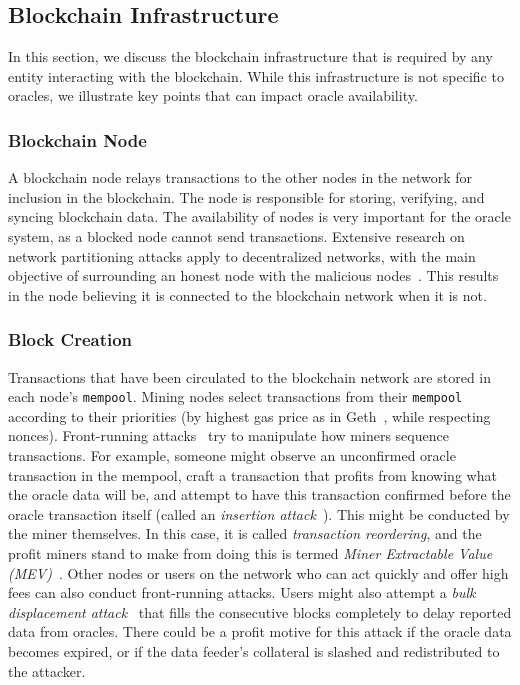 \subsection{Blockchain Infrastructure}  \label{blockchainInfrastructure}

In this section, we discuss the blockchain infrastructure that is required by any entity interacting with the blockchain. While this infrastructure is not specific to oracles, we illustrate key points that can impact oracle availability. 

\subsubsection{Blockchain Node} %

A blockchain node relays transactions to the other nodes in the network for inclusion in the blockchain. The node is responsible for storing, verifying, and syncing blockchain data. The availability of nodes is very important for the oracle system, as a blocked node cannot send transactions. Extensive research on network partitioning attacks apply to decentralized networks, with the main objective of surrounding an honest node with the malicious nodes~\cite{vasek2014empirical,neudecker2015simulation,zhang2019double,heilman2015eclipse,henningsen2019eclipsing}. This results in the node believing it is connected to the blockchain network when it is not.
 

\subsubsection{Block Creation}\label{block_creation}
Transactions that have been circulated to the blockchain network are stored in each node's \texttt{mempool}. Mining nodes select transactions from their \texttt{mempool} according to their priorities (\eg by highest gas price as in Geth~\cite{geth}, while respecting nonces). Front-running attacks~\cite{eskandari2019sok,daian2020flash} try to manipulate how miners sequence transactions. For example, someone might observe an unconfirmed oracle transaction in the mempool, craft a transaction that profits from knowing what the oracle data will be, and attempt to have this transaction confirmed before the oracle transaction itself (called an \textit{insertion attack}~\cite{eskandari2019sok}). This might be conducted by the miner themselves. In this case, it is called \textit{transaction reordering}, and the profit miners stand to make from doing this is termed \textit{Miner Extractable Value (MEV)}~\cite{daian2020flash}. Other nodes or users on the network who can act quickly and offer high fees can also conduct front-running attacks. Users might also attempt a \textit{bulk displacement attack}~\cite{eskandari2019sok} that fills the consecutive blocks completely to delay reported data from oracles. There could be a profit motive for this attack if the oracle data becomes expired, or if the data feeder's collateral is slashed and redistributed to the attacker. 

